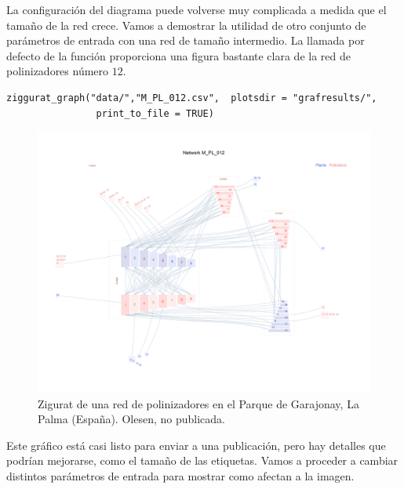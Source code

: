 \clearpage
La configuración del diagrama puede volverse muy complicada a medida que el tamaño de la red crece. Vamos a demostrar la
utilidad de otro conjunto de parámetros de entrada con una red de tamaño intermedio. La llamada por defecto de la función
proporciona una figura bastante clara de la red de polinizadores número $12$.

\fontsize{3.5mm}{3.5mm}\selectfont
\begin{verbatim}
ziggurat_graph("data/","M_PL_012.csv",  plotsdir = "grafresults/", 
                print_to_file = TRUE)
\end{verbatim}
\normalsize

\begin{figure}[hp!]
\centering
\includegraphics[scale=0.45]{ManFigs/M_PL_012_ziggurat.png}
\caption {Zigurat de una red de polinizadores en el Parque de Garajonay, La Palma (España). Olesen, no publicada.}
\label{fig:AKMAN_ziggurat_012}
\end{figure}

Este gráfico está casi listo para enviar a una publicación, pero hay detalles que podrían mejorarse, como el tamaño
de las etiquetas. Vamos a proceder a cambiar distintos parámetros de entrada para mostrar como afectan a la imagen.

